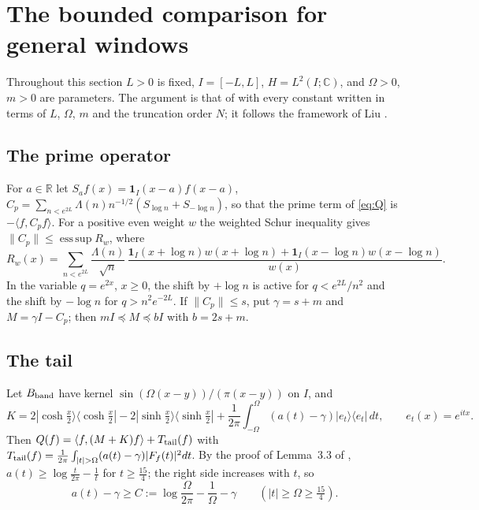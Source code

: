 \documentclass[11pt]{amsart}
\theoremstyle{remark}
\numberwithin{equation}{section}
\newcommand{\R}{\mathbb{R}}
\newcommand{\C}{\mathbb{C}}
\begin{document}
\section{The bounded comparison for general windows}\label{sec:tail}
Throughout this section $L>0$ is fixed, $I=[-L,L]$, $H=L^2(I;\C)$, and $\Omega>0$, $m>0$ are parameters. The argument is that of \cite[Sections~3--4]{MoriVI} with every constant written in terms of $L$, $\Omega$, $m$ and the truncation order $N$; it follows the framework of Liu \cite{Liu2026}.

\subsection{The prime operator}
For $a\in\R$ let $S_af(x)=\mathbf 1_I(x-a)f(x-a)$, $C_p=\sum_{n<e^{2L}}\Lambda(n)n^{-1/2}(S_{\log n}+S_{-\log n})$, so that the prime term of \eqref{eq:Q} is $-\langle f,C_pf\rangle$. For a positive even weight $w$ the weighted Schur inequality gives $\|C_p\|\le\operatorname{ess\,sup}R_w$, where
\[
R_w(x)=\sum_{n<e^{2L}}\frac{\Lambda(n)}{\sqrt n}\,\frac{\mathbf 1_I(x+\log n)w(x+\log n)+\mathbf 1_I(x-\log n)w(x-\log n)}{w(x)} .
\]
In the variable $q=e^{2x}$, $x\ge0$, the shift by $+\log n$ is active for $q<e^{2L}/n^2$ and the shift by $-\log n$ for $q>n^2e^{-2L}$. If $\|C_p\|\le s$, put $\gamma=s+m$ and $M=\gamma I-C_p$; then $mI\preceq M\preceq bI$ with $b=2s+m$.

\subsection{The tail}
Let $B_{\rm band}$ have kernel $\sin(\Omega(x-y))/(\pi(x-y))$ on $I$, and
\[
K=2|\cosh\tfrac x2\rangle\langle\cosh\tfrac x2|-2|\sinh\tfrac x2\rangle\langle\sinh\tfrac x2|+\frac1{2\pi}\int_{-\Omega}^{\Omega}(a(t)-\gamma)|e_t\rangle\langle e_t|\,dt,\qquad e_t(x)=e^{itx}.
\]
Then $Q(f)=\langle f,(M+K)f\rangle+T_{\rm tail}(f)$ with $T_{\rm tail}(f)=\frac1{2\pi}\int_{|t|>\Omega}(a(t)-\gamma)|F_f(t)|^2dt$. By the proof of Lemma~3.3 of \cite{MoriVI}, $a(t)\ge\log\frac t{2\pi}-\frac1t$ for $t\ge\frac{15}4$; the right side increases with $t$, so
\begin{equation}\label{eq:C}
a(t)-\gamma\ge C:=\log\frac\Omega{2\pi}-\frac1\Omega-\gamma\qquad(|t|\ge\Omega\ge\tfrac{15}4).
\end{equation}
\end{document}
